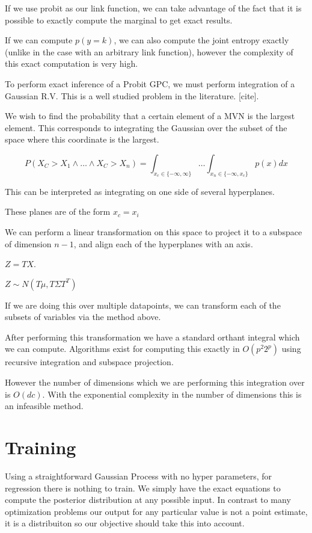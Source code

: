 \documentclass[12pt, a4paper]{report}
\theoremstyle{definition}
\theoremstyle{definition}
\theoremstyle{definition}
\begin{document}
\label{sec:Integration}

If we use probit as our link function, we can take advantage of the fact that it is possible to exactly compute the marginal to get exact results.

If we can compute $p(y=k)$, we can also compute the joint entropy exactly (unlike in the case with an arbitrary link function), however the complexity of this exact computation is very high.



To perform exact inference of a Probit GPC, we must perform integration of a Gaussian R.V. This is a well studied problem in the literature. [cite].


We wish to find the probability that a certain element of a MVN is the largest element. This corresponds to integrating the Gaussian over the subset of the space where this coordinate is the largest.

$$P(X_C > X_1 \land \ldots \land X_C > X_n) = \int_{x_c \in \{ -\infty, \infty \} } \ldots \int_{x_n \in \{ -\infty , x_c \}} p(x) dx$$

This can be interpreted as integrating on one side of several hyperplanes.

These planes are of the form $x_c = x_i$

We can perform a linear transformation on this space to project it to a subspace of dimension $n-1$, and align each of the hyperplanes with an axis.

$Z = TX$.

$Z \sim N(T \mu, T \Sigma T^T)$


If we are doing this over multiple datapoints, we can transform each of the subsets of variables via the method above.

After performing this transformation we have a standard orthant integral which we can compute. Algorithms exist for computing this exactly in $O(p^2 2^p)$ using recursive integration and subspace projection. \cite{orthant}


However the number of dimensions which we are performing this integration over is $O(dc)$. With the exponential complexity in the number of dimensions this is an infeasible method.



\section{Training}

Using a straightforward Gaussian Process with no hyper parameters, for regression there is nothing to train. We simply have the exact equations to compute the posterior distribution at any possible input. In contrast to many optimization problems our output for any particular value is not a point estimate, it is a distribuiton so our objective should take this into account.
\end{document}
